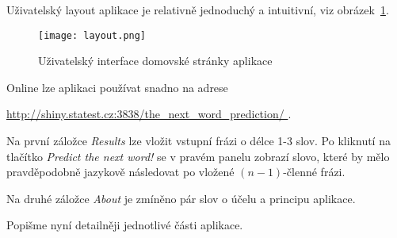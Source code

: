 Uživatelský layout aplikace je relativně jednoduchý a intuitivní, viz
obrázek~\ref{layout_fig}.

\begin{figure}[h]
  \centering
  \texttt{[image: layout.png]}
  \caption{Uživatelský interface domovské stránky aplikace}\label{layout_fig}
\end{figure}

Online lze aplikaci používat snadno na adrese

\begin{center}
  \href{http://shiny.statest.cz:3838/the\_next\_word\_prediction/}{%
    http://shiny.statest.cz:3838/the\_next\_word\_prediction/
  }.
\end{center}

Na první záložce \textit{Results} lze vložit vstupní frázi o délce 1-3 slov.
Po kliknutí na tlačítko \textit{Predict the next word!} se v pravém
panelu zobrazí slovo, které by mělo pravděpodobně jazykově následovat
po vložené $(n - 1)$-členné frázi.

Na druhé záložce \textit{About} je zmíněno pár slov o účelu a principu aplikace.

Popišme nyní detailněji jednotlivé části aplikace.

